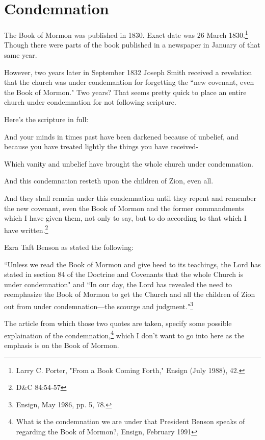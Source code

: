 \chapter{Condemnation}

The Book of Mormon was published in 1830. Exact date was 26 March 1830.\footnote{
Larry C. Porter, "From a Book Coming Forth," Ensign (July 1988), 42.} Though there
were parts of the book published in a newspaper in January of that same year.

However, two years later in September 1832 Joseph Smith received a revelation that 
the church was under condemantion for forgetting the ``new covenant, even the Book of
Mormon." Two years? That seems pretty quick to place an entire church under
condemnation for not following scripture.

Here's the scripture in full:

\begin{displayquote}
And your minds in times past have been darkened because of unbelief, and because you 
have treated lightly the things you have received-

Which vanity and unbelief have brought the whole church under condemnation.

And this condemnation resteth upon the children of Zion, even all.

And they shall remain under this condemnation until they repent and remember the new 
covenant, even the Book of Mormon and the former commandments which I have given 
them, not only to say, but to do according to that which I have written.\footnote{
D\&C 84:54-57
}
\end{displayquote}

Ezra Taft Benson as stated the following:

\begin{displayquote}
``Unless we read the Book of Mormon and give heed to its teachings, the Lord has stated 
in section 84 of the Doctrine and Covenants that the whole Church is under 
condemnation" and ``In our day, the Lord has revealed the need to reemphasize the 
Book of Mormon to get the Church and all the children of Zion out from under 
condemnation—the scourge and judgment."\footnote{Ensign, May 1986, pp. 5, 78.}
\end{displayquote}

The article from which those two quotes are taken, specify some possible explaination
of the condemnation,\footnote{What is the condemnation we are under that President 
Benson speaks of regarding the Book of Mormon?, Ensign, February 1991} which I don't
want to go into here as the emphasis is on the Book of Mormon.